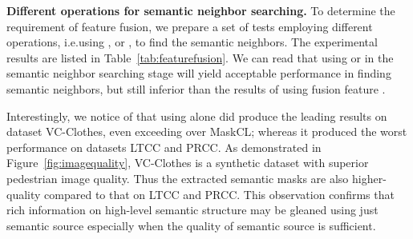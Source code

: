 \documentclass[10pt,twocolumn,letterpaper]{article}
\newcommand{\myparagraph}[1]{\noindent\textbf{#1.}}
\def\ie{i.e.}
\begin{document}
\myparagraph{Different operations for semantic neighbor searching}
To determine the requirement of feature fusion, we prepare a set of tests employing different operations, \ie  using ,  or , to find the semantic neighbors.
The experimental results are listed in Table~\ref{tab:featurefusion}. We can read that using  or  in the semantic neighbor searching stage will yield acceptable performance in finding semantic neighbors, but still inferior than the results of using fusion feature .


\begin{table}[!htb]
\small
\begin{center}
\vspace{-5pt}
\end{center}
\vspace{-4pt}
\caption{Experiments Results of Various Semantic Neighbor Searching Operations on LTCC, PRCC, and VC-Clothes.}
\label{tab:featurefusion}
\vspace{-4pt}
\end{table}


Interestingly, we notice of that using  alone did produce the leading results on dataset VC-Clothes, even exceeding over MaskCL; whereas it produced the worst performance on datasets LTCC and PRCC. 
As demonstrated in Figure~\ref{fig:imagequality}, VC-Clothes is a synthetic dataset with superior pedestrian image quality. Thus the extracted semantic masks are also higher-quality compared to that on LTCC and PRCC.
This observation confirms that rich information on high-level semantic structure may be gleaned using just semantic source especially when the quality of semantic source is sufficient. 
\end{document}
